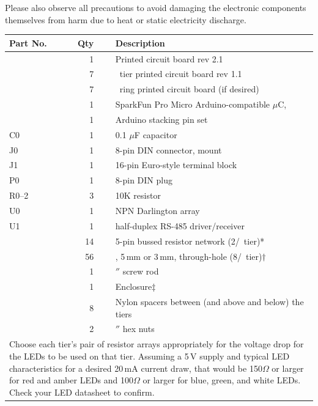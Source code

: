  Please also observe all precautions to avoid damaging
the electronic components themselves from harm due to heat or static electricity discharge.
\begin{table}
    \begin{center}
	\begin{tabular}{lrll}\toprule
		{\bfseries Part No.}&{\bfseries Qty}&&{\bfseries Description}\\\midrule
		&1&&Printed circuit board rev 2.1\\
		&7&&\led\ tier printed circuit board rev 1.1\\
		&7&&\led\ ring printed circuit board (if desired)\\
		&1&&SparkFun Pro Micro Arduino-compatible $\mu$C, \strong{5\,V version}\\
		&1&&Arduino stacking pin set\\
		C0&1&&0.1 $\mu$F capacitor\\
		J0&1&&8-pin DIN connector, \acronym{PCB} mount\\
		J1&1&&16-pin Euro-style terminal block\\
		P0&1&&8-pin DIN plug\\
		R0--2&3&&10K resistor\\
		U0&1&&\mc{ULN2003A} NPN Darlington array\\
		U1&1&&\mc{THVD1439} half-duplex RS-485 driver/receiver\\
		  &14&&5-pin bussed resistor network (2/\led\ tier)*\\
		  &56&&\led, 5\,mm or 3\,mm, through-hole (8/\led\ tier)$\dagger$\\
		  &1&&\sfrac14$''$ screw rod\\
		  &1&&Enclosure$\ddagger$\\
		  &8&&Nylon spacers between (and above and below) the tiers\\
		  &2&&\sfrac14$''$ hex nuts\\
		\bottomrule
		\multicolumn{4}{p{\textwidth}}{\tiny *Choose each tier's pair of resistor arrays appropriately for the voltage drop
		for the LEDs to be used on that tier. Assuming a 5\,V supply and
		typical LED characteristics for a desired 20\,mA current draw, that would be 150$\Omega$ or larger for red and amber LEDs and 100$\Omega$ or larger
		for blue, green, and white LEDs. Check your LED datasheet to confirm.

}
\end{tabular}
\end{center}
\end{table}
